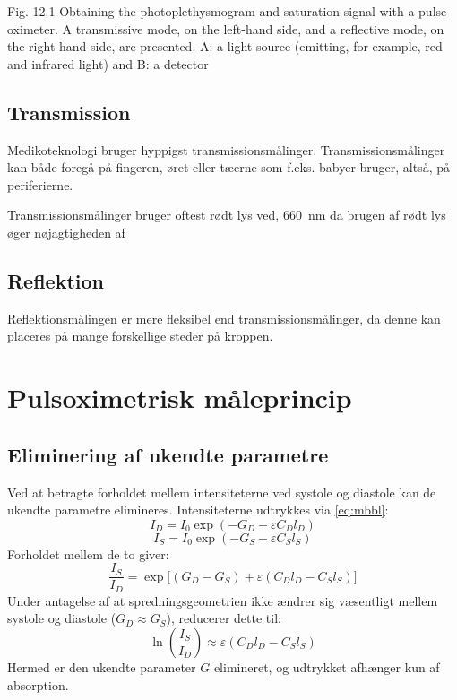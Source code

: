 Fig. 12.1 Obtaining the photoplethysmogram and saturation signal with a pulse oximeter. A transmissive mode, on the
left-hand side, and a reflective mode, on the right-hand side, are presented. A: a light source (emitting, for example, red
and infrared light) and B: a detector

\subsection{Transmission}
\label{sec:transmission}
Medikoteknologi bruger hyppigst transmissionsmålinger. Transmissionsmålinger kan både foregå på fingeren, øret eller tæerne som f.eks. babyer bruger, altså, på periferierne.

Transmissionsmålinger bruger oftest rødt lys ved, \SI{660}{nm} da brugen af rødt lys øger nøjagtigheden af 

\subsection{Reflektion}
\label{sec:refleksion}
Reflektionsmålingen er mere fleksibel end transmissionsmålinger, da denne kan placeres på mange forskellige steder på kroppen.

\section{Pulsoximetrisk måleprincip}
\label{sec:pulseox_princip}

\subsection{Eliminering af ukendte parametre}
Ved at betragte forholdet mellem intensiteterne ved systole og diastole kan de ukendte parametre elimineres. Intensiteterne udtrykkes via \cref{eq:mbbl}:
\begin{equation}
    I_D = I_0 \exp(-G_D - \varepsilon C_D l_D)
    \label{eq:i_diastole}
\end{equation}
\begin{equation}
    I_S = I_0 \exp(-G_S - \varepsilon C_S l_S)
    \label{eq:i_systole}
\end{equation}
Forholdet mellem de to giver:
\begin{equation}
    \frac{I_S}{I_D} = \exp\!\Big[(G_D - G_S) + \varepsilon(C_D l_D - C_S l_S)\Big]
    \label{eq:is_id_ratio}
\end{equation}
Under antagelse af at spredningsgeometrien ikke ændrer sig væsentligt mellem systole og diastole ($G_D \approx G_S$), reducerer dette til:
\begin{equation}
    \ln\!\left(\frac{I_S}{I_D}\right) \approx \varepsilon(C_D l_D - C_S l_S)
    \label{eq:ln_ratio_simplified}
\end{equation}
Hermed er den ukendte parameter $G$ elimineret, og udtrykket afhænger kun af absorption.

